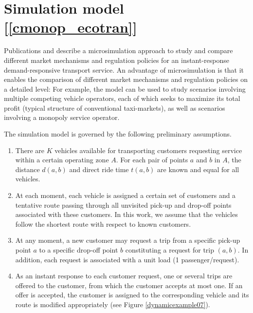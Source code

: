 \documentclass[dissertation,draft*]{aaltoseries}
\begin{document}
\section{Simulation model [\ref{cmonop_ecotran}]}
\label{simulationmodel}
Publications  and  describe a microsimulation approach to study and compare different market mechanisms and regulation policies for
an instant-response demand-responsive transport service.
An advantage of microsimulation is that 
it enables the comparison of different market mechanisms and regulation policies on a detailed level:
For example, the model can be used to study scenarios involving multiple competing vehicle operators,
each of which seeks to maximize its total profit (typical structure of conventional taxi-markets), as well as
scenarios involving a monopoly service operator.

The simulation model is governed by the following preliminary assumptions.
\begin{enumerate}
\item
There are $K$ vehicles available for transporting customers requesting service within a certain operating zone $A$. For each pair of points $a$ and $b$ in $A$, the distance $d(a,b)$ and direct ride time $t(a,b)$ are known and equal for all vehicles.
\item
At each moment, each vehicle is assigned a certain set of customers and a tentative route passing through all unvisited pick-up and drop-off points associated with these customers. In this work, we assume that the vehicles follow the shortest route with respect to known customers.
\item
At any moment, a new customer may request a trip from a specific pick-up point $a$ to a specific drop-off point $b$ constituting a request for trip $(a,b)$. 
In addition, each request is associated with a unit load (1 passenger/request).
\item
As an instant response to each customer request, one or several trips are offered to the customer, from which the customer
accepts at most one. 
If an offer is accepted, the customer is assigned to the corresponding vehicle and its route is modified appropriately (see Figure \ref{dynamicexample07}).
\end{enumerate}
\end{document}
